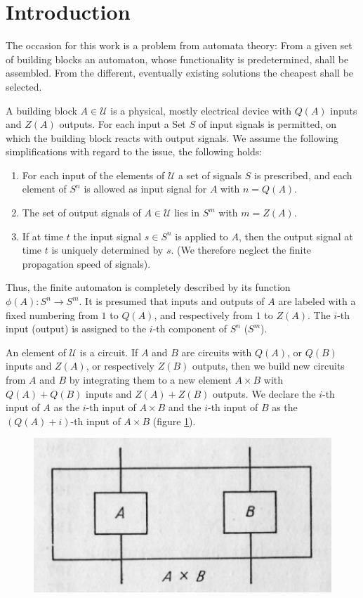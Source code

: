 \documentclass{article}
\begin{document}
\section{Introduction}
The occasion for this work is a problem from automata theory: From a given set of building blocks an automaton, whose functionality is predetermined, shall be assembled. From the different, eventually existing  solutions the cheapest shall be selected. 

A building block $A \in \mathcal{U}$ is a physical, mostly electrical device with $Q(A)$ inputs and $Z(A)$ outputs. For each input a Set $S$ of input signals is permitted, on which the building block reacts with output signals. We assume the following simplifications with regard to the issue, the following holds:

\begin{enumerate}
\item For each input of the elements of $\mathcal{U}$ a set of signals $S$ is prescribed, and each element of $S^n$ is allowed as input signal for $A$ with $n = Q(A)$.
\item The set of output signals of $A \in \mathcal{U}$ lies in $S^m$ with $m = Z(A)$.
\item If at time $t$ the input signal $s \in S^n$ is applied to $A$, then the output signal at time $t$ is uniquely determined by $s$. (We therefore neglect the finite propagation speed of signals).
\end{enumerate}

Thus, the finite automaton is completely described by its function $\phi(A):S^n \rightarrow S^m$. It is presumed that inputs and outputs of $A$ are labeled with a fixed numbering from $1$ to $Q(A)$, and respectively from $1$ to $Z(A)$. The $i$-th input (output) is assigned to the $i$-th component of $S^n$ ($S^m$). 

An element of $\mathcal{U}$ is a circuit. If $A$ and $B$ are circuits with $Q(A)$, or $Q(B)$ inputs and $Z(A)$, or respectively $Z(B)$ outputs, then we build new circuits from $A$ and $B$ by integrating them to a new element $A\times B$ with $Q(A)+Q(B)$ inputs and $Z(A)+Z(B)$ outputs. We declare the $i$-th input of $A$ as the $i$-th input of $A\times B$ and the $i$-th input of $B$ as the $(Q(A) + i)$-th input of $A\times B$ (figure \ref{fig:figure1}).

\begin{figure}
\includegraphics[]{figure1.png}
  \centering
\caption{}
\label{fig:figure1}
\end{figure}
\end{document}
